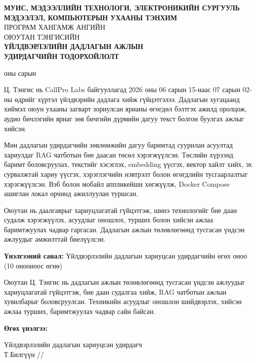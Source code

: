 \documentclass[../main.tex]{subfiles}
\begin{document}
\begingroup
\normalspace
\thispagestyle{plain}

\begin{center}
\textbf{МУИС, МЭДЭЭЛЛИЙН ТЕХНОЛОГИ, ЭЛЕКТРОНИКИЙН СУРГУУЛЬ}\\[0.4em]
\textbf{МЭДЭЭЛЭЛ, КОМПЬЮТЕРЫН УХААНЫ ТЭНХИМ}\\[1em]
ПРОГРАМ ХАНГАМЖ АНГИЙН\\
ОЮУТАН ТЭНГИСИЙН\\[0.8em]
\textbf{ҮЙЛДВЭРЛЭЛИЙН ДАДЛАГЫН АЖЛЫН\\[0.3em]
УДИРДАГЧИЙН ТОДОРХОЙЛОЛТ}
\end{center}

\vspace{0.5em}
 оны \underline{\hspace{1cm}} сарын \underline{\hspace{1cm}}
\vspace{1em}

Ц. Тэнгис нь CallPro Labs байгууллагад 2026 оны 06 сарын 15-наас 07 сарын
02-ны өдрийг хүртэл үйлдвэрийн дадлага хийж гүйцэтгэлээ. Дадлагын хугацаанд
хиймэл оюун ухааны загварт зориулсан ярианы өгөгдөл бэлтгэх ажилд оролцож,
аудио бичлэгийн яриаг зөв бичгийн дүрмийн дагуу текст болгон буулгах ажлыг хийсэн.

Мөн дадлагын удирдагчийн зөвлөмжийн дагуу баримтад суурилан асуултад
хариулдаг RAG чатботын бие даасан төсөл хэрэгжүүлсэн. Төслийн хүрээнд баримт
боловсруулах, текстийг хэсэглэх, embedding үүсгэх, вектор хайлт хийх, эх
сурвалжтай хариу үүсгэх, хэрэглэгчийн нэвтрэлт болон өгөгдлийн тусгаарлалтыг
хэрэгжүүлсэн. Вэб болон мобайл аппликейшн хөгжүүлж, Docker Compose ашиглан
локал орчинд ажиллуулан туршсан.

Оюутан нь даалгаврыг хариуцлагатай гүйцэтгэж, шинэ технологийг бие даан
судалж хэрэгжүүлэх, асуудлыг оношлох, турших болон хийсэн ажлаа баримтжуулах
чадвар гаргасан. Дадлагын ажлын төлөвлөгөөнд тусгасан үндсэн ажлуудыг
амжилттай биелүүлсэн.

\vspace{1.2em}
\noindent\textbf{Үнэлгээний санал:} Үйлдвэрлэлийн дадлагын хариуцсан
удирдагчийн өгөх оноо (10 онооноос өгнө)

Оюутан Ц. Тэнгис нь дадлагын ажлын төлөвлөгөөнд тусгасан үндсэн ажлуудыг
хариуцлагатай гүйцэтгэж, бие даан судалгаа хийж, RAG чатботын ажлын хувилбарыг
боловсруулсан. Техникийн асуудлыг оношлон шийдвэрлэх, хийсэн ажлаа турших,
баримтжуулах чадвар сайн байсан.

\vspace{1.2em}
\noindent\textbf{Өгөх үнэлгээ:} \underline{\hspace{2cm}}

\vspace{2em}
\noindent Үйлдвэрлэлийн дадлагын хариуцсан удирдагч\\[1em]
\noindent Т.Билгүүн \hfill /\hspace{3cm}/

\endgroup
\end{document}
